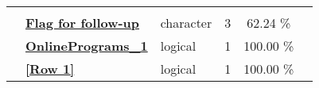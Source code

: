 \documentclass[]{article}
\begin{document}
\begin{longtable}[]{@{}lllrcl@{}}
\begin{minipage}[t]{0.12\columnwidth}
\strut
\end{minipage}\tabularnewline
\begin{minipage}[t]{0.07\columnwidth}\raggedright\strut
\strut
\end{minipage} & \begin{minipage}[t]{0.35\columnwidth}\raggedright\strut
\textbf{\protect\hyperlink{flag-for-follow-up}{Flag for
follow-up}}\strut
\end{minipage} & \begin{minipage}[t]{0.11\columnwidth}\raggedright\strut
character\strut
\end{minipage} & \begin{minipage}[t]{0.10\columnwidth}\raggedleft\strut
3\strut
\end{minipage} & \begin{minipage}[t]{0.10\columnwidth}\centering\strut
62.24 \%\strut
\end{minipage} & \begin{minipage}[t]{0.12\columnwidth}\raggedright\strut
\strut
\end{minipage}\tabularnewline
\begin{minipage}[t]{0.07\columnwidth}\raggedright\strut
\strut
\end{minipage} & \begin{minipage}[t]{0.35\columnwidth}\raggedright\strut
\textbf{\protect\hyperlink{onlineprograms_1}{OnlinePrograms\_1}}\strut
\end{minipage} & \begin{minipage}[t]{0.11\columnwidth}\raggedright\strut
logical\strut
\end{minipage} & \begin{minipage}[t]{0.10\columnwidth}\raggedleft\strut
1\strut
\end{minipage} & \begin{minipage}[t]{0.10\columnwidth}\centering\strut
100.00 \%\strut
\end{minipage} & \begin{minipage}[t]{0.12\columnwidth}\raggedright\strut
\strut
\end{minipage}\tabularnewline
\begin{minipage}[t]{0.07\columnwidth}\raggedright\strut
\strut
\end{minipage} & \begin{minipage}[t]{0.35\columnwidth}\raggedright\strut
\textbf{\protect\hyperlink{row-1}{{[}Row 1{]}}}\strut
\end{minipage} & \begin{minipage}[t]{0.11\columnwidth}\raggedright\strut
logical\strut
\end{minipage} & \begin{minipage}[t]{0.10\columnwidth}\raggedleft\strut
1\strut
\end{minipage} & \begin{minipage}[t]{0.10\columnwidth}\centering\strut
100.00 \%\strut
\end{minipage} & \begin{minipage}[t]{0.12\columnwidth}\raggedright\strut
\strut
\end{minipage}\tabularnewline
\bottomrule
\end{longtable}
\end{document}
